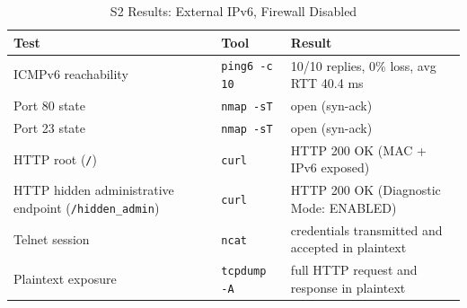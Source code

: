\begin{table}[H]
    \centering
    \caption{S2 Results: External IPv6, Firewall Disabled}
    \label{tab:s2-external-ipv6-fw-disabled-results}
    \begin{tabularx}{\textwidth}{p{} p{} L}
        \toprule
        \textbf{\color{white}Test} & \textbf{\color{white}Tool} & \textbf{\color{white}Result} \\
        \midrule
        ICMPv6 reachability & \texttt{ping6 -c 10} & 10/10 replies, 0\% loss, avg RTT 40.4 ms \\
        Port 80 state & \texttt{nmap -sT} & open (syn-ack) \\
        Port 23 state & \texttt{nmap -sT} & open (syn-ack) \\
        HTTP root (\texttt{/}) & \texttt{curl} & HTTP 200 OK (MAC + IPv6 exposed) \\
        HTTP hidden administrative endpoint (\texttt{/hidden\_admin}) & \texttt{curl} & HTTP 200 OK (Diagnostic Mode: ENABLED) \\
        Telnet session & \texttt{ncat} & credentials transmitted and accepted in plaintext \\
        Plaintext exposure & \texttt{tcpdump -A} & full HTTP request and response in plaintext \\
        \bottomrule
    \end{tabularx}
\end{table}
